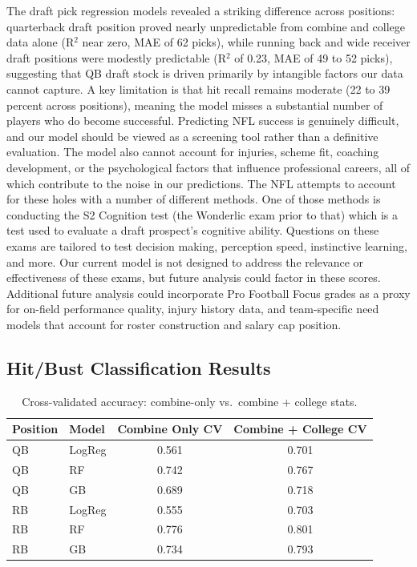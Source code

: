\documentclass[11pt]{article}
\begin{document}
The draft pick regression models revealed a striking difference across positions: quarterback draft position proved nearly unpredictable from combine and college data alone (R$^2$ near zero, MAE of 62 picks), while running back and wide receiver draft positions were modestly predictable (R$^2$ of 0.23, MAE of 49 to 52 picks), suggesting that QB draft stock is driven primarily by intangible factors our data cannot capture. A key limitation is that hit recall remains moderate (22 to 39 percent across positions), meaning the model misses a substantial number of players who do become successful. Predicting NFL success is genuinely difficult, and our model should be viewed as a screening tool rather than a definitive evaluation. The model also cannot account for injuries, scheme fit, coaching development, or the psychological factors that influence professional careers, all of which contribute to the noise in our predictions. The NFL attempts to account for these holes with a number of different methods. One of those methods is conducting the S2 Cognition test (the Wonderlic exam prior to that) which is a test used to evaluate a draft prospect's cognitive ability. Questions on these exams are tailored to test decision making, perception speed, instinctive learning, and more. Our current model is not designed to address the relevance or effectiveness of these exams, but future analysis could factor in these scores. Additional future analysis could incorporate Pro Football Focus grades as a proxy for on-field performance quality, injury history data, and team-specific need models that account for roster construction and salary cap position.


\subsection{Hit/Bust Classification Results}


\begin{table}[H]
  \centering
  \begin{tabular}{llcc}
    \toprule
    Position & Model & Combine Only CV & Combine + College CV \\
    \midrule
    QB & LogReg & 0.561 & 0.701 \\
    QB & RF & 0.742 & 0.767 \\
    QB & GB & 0.689 & 0.718 \\
    \midrule
    RB & LogReg & 0.555 & 0.703 \\
    RB & RF & 0.776 & 0.801 \\
    RB & GB & 0.734 & 0.793 \\
    \bottomrule
  \end{tabular}
  \caption{Cross-validated accuracy: combine-only vs.\ combine + college stats.}
  \label{tab:cv_comparison}
\end{table}
\end{document}
